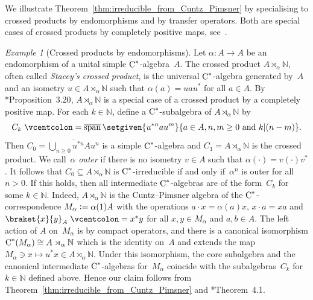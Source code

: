 \documentclass[a4paper]{amsart}
\theoremstyle{plain}
\theoremstyle{definition}
\theoremstyle{remark}
\newtheorem{example}[theorem]{Example}
\numberwithin{theorem}{section}
\numberwithin{equation}{section}
\DeclareMathOperator*{\clsp}{\overline{span}} %
\newcommand*{\nb}{\nobreakdash}
\newcommand*{\N}{\mathbb N}
\newcommand*{\Cst}{\textup C^*}%
\newcommand*{\defeq}{\mathrel{\vcentcolon=}}%
\begin{document}
We illustrate Theorem~\ref{thm:irreducible_from_Cuntz_Pimsner} by
specialising to crossed products by endomorphisms and by transfer
operators.
Both are special cases of crossed products by completely positive
maps, see~\cite{Kwasniewski:Exel_crossed}.

\begin{example}[Crossed products by endomorphisms]
  \label{ex:endomorphism_crossed_product}
  Let \(\alpha\colon A\to A\) be an endomorphism of a unital simple
  \(\Cst\)\nb-algebra~\(A\).
  The crossed product \(A\rtimes_\alpha\N\), often called
  \emph{Stacey's crossed product}, is the universal
  \(\Cst\)\nb-algebra generated by~\(A\) and an isometry \(u\in
  A\rtimes_\alpha\N\) such that \(\alpha(a)=u a u^*\) for all \(a\in
  A\).
  By \cite{Kwasniewski:Exel_crossed}*{Proposition~3.20},
  \(A\rtimes_\alpha\N\)  is a special case of a crossed product by a
  completely positive map.
  For each \(k\in \N\), define a \(\Cst\)\nb-subalgebra of
  \(A\rtimes_\alpha\N\) by
  \[
    C_k\defeq
    \clsp\setgiven{u^{*n}au^m}{a\in A, n,m\ge 0  \text{ and } k |(n-m)}.
  \]
  Then \(C_0=\overline{\bigcup_{n\ge 0}u^{*n} A u^n}\) is a
  simple \(\Cst\)\nb-algebra and \(C_1=A\rtimes_\alpha\N\) is the
  crossed product.
  We call~\(\alpha\) \emph{outer} if there is no isometry \(v\in A\)
  such that \(\alpha(\cdot)=v(\cdot)v^*\).
  It follows that
  \(C_0\subseteq A\rtimes_\alpha\N\) is \(\Cst\)\nb-irreducible
  if and only if~\(\alpha^n\) is outer for all \(n>0\).
  If this holds, then all intermediate \(\Cst\)\nb-algebras are of the
  form~\(C_k\) for some \(k\in \N\).
  Indeed, \(A\rtimes_\alpha\N\) is the Cuntz--Pimsner algebra of the
  \(\Cst\)\nb-correspondence \(M_\alpha\defeq \alpha(1)A\) with the
  operations \(a\cdot x=\alpha(a)x\), \(x\cdot a=xa\) and
  \(\braket{x}{y}_A\defeq x^*y\) for all \(x,y\in M_\alpha\) and
  \(a,b\in A\).
  The left action of \(A\) on~\(M_\alpha\) is by compact operators,
  and there is a canonical isomorphism \(\Cst(M_\alpha)\cong
  A\rtimes_\alpha\N\) which is the identity on~\(A\) and extends the
  map \(M_\alpha\ni x\mapsto u^*x\in A\rtimes_\alpha\N\).
  Under this isomorphism, the core subalgebra and the canonical
  intermediate \(\Cst\)\nb-algebras for~\(M_\alpha\) coincide with the
  subalgebras~\(C_k\) for \(k\in \N\) defined above.
  Hence our claim follows from
  Theorem~\ref{thm:irreducible_from_Cuntz_Pimsner} and
  \cite{Schweizer:Dilations_correspondences}*{Theorem~4.1}.
\end{example}
\end{document}
